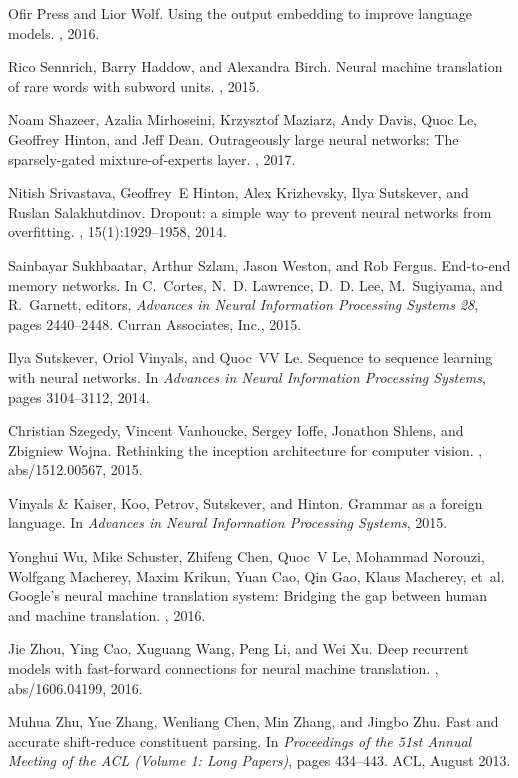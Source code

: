 \documentclass{article}
\begin{document}
\begin{thebibliography}{10}
Ofir Press and Lior Wolf.
\newblock Using the output embedding to improve language models.
, 2016.

Rico Sennrich, Barry Haddow, and Alexandra Birch.
\newblock Neural machine translation of rare words with subword units.
, 2015.

Noam Shazeer, Azalia Mirhoseini, Krzysztof Maziarz, Andy Davis, Quoc Le,
  Geoffrey Hinton, and Jeff Dean.
\newblock Outrageously large neural networks: The sparsely-gated
  mixture-of-experts layer.
, 2017.

Nitish Srivastava, Geoffrey~E Hinton, Alex Krizhevsky, Ilya Sutskever, and
  Ruslan Salakhutdinov.
\newblock Dropout: a simple way to prevent neural networks from overfitting.
, 15(1):1929--1958, 2014.

Sainbayar Sukhbaatar, Arthur Szlam, Jason Weston, and Rob Fergus.
\newblock End-to-end memory networks.
\newblock In C.~Cortes, N.~D. Lawrence, D.~D. Lee, M.~Sugiyama, and R.~Garnett,
  editors, {\em Advances in Neural Information Processing Systems 28}, pages
  2440--2448. Curran Associates, Inc., 2015.

Ilya Sutskever, Oriol Vinyals, and Quoc~VV Le.
\newblock Sequence to sequence learning with neural networks.
\newblock In {\em Advances in Neural Information Processing Systems}, pages
  3104--3112, 2014.

Christian Szegedy, Vincent Vanhoucke, Sergey Ioffe, Jonathon Shlens, and
  Zbigniew Wojna.
\newblock Rethinking the inception architecture for computer vision.
, abs/1512.00567, 2015.

{Vinyals {\&} Kaiser}, Koo, Petrov, Sutskever, and Hinton.
\newblock Grammar as a foreign language.
\newblock In {\em Advances in Neural Information Processing Systems}, 2015.

Yonghui Wu, Mike Schuster, Zhifeng Chen, Quoc~V Le, Mohammad Norouzi, Wolfgang
  Macherey, Maxim Krikun, Yuan Cao, Qin Gao, Klaus Macherey, et~al.
\newblock Google's neural machine translation system: Bridging the gap between
  human and machine translation.
, 2016.

Jie Zhou, Ying Cao, Xuguang Wang, Peng Li, and Wei Xu.
\newblock Deep recurrent models with fast-forward connections for neural
  machine translation.
, abs/1606.04199, 2016.

Muhua Zhu, Yue Zhang, Wenliang Chen, Min Zhang, and Jingbo Zhu.
\newblock Fast and accurate shift-reduce constituent parsing.
\newblock In {\em Proceedings of the 51st Annual Meeting of the ACL (Volume 1:
  Long Papers)}, pages 434--443. ACL, August 2013.

\end{thebibliography}
\pagebreak
\end{document}
